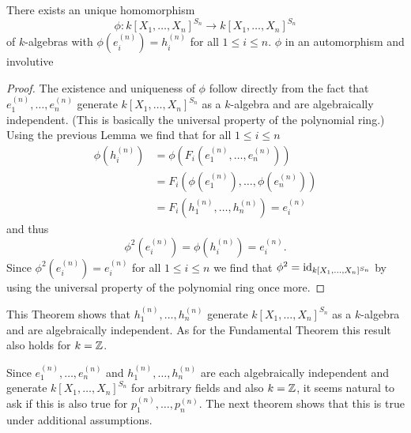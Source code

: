 \begin{theorem}
There exists an unique homomorphism
\[
          \phi
  \colon  k[X_1, \dotsc, X_n]^{S_n}
  \to     k[X_1, \dotsc, X_n]^{S_n}
\]
of $k$-algebras with $\phi\left(e^{(n)}_i\right) = h^{(n)}_i$ for all $1 \leq i \leq n$.
$\phi$ in an automorphism and involutive
\end{theorem}
\begin{proof}
  The existence and uniqueness of $\phi$ follow directly from the fact that $e^{(n)}_1, \dotsc, e^{(n)}_n$ generate $k[X_1, \dotsc, X_n]^{S_n}$ as a $k$-algebra and are algebraically independent.
  (This is basically the universal property of the polynomial ring.)
  Using the previous Lemma we find that for all $1 \leq i \leq n$
  \begin{align*}
        \phi\left(h^{(n)}_i\right)
    &=  \phi\left(F_i\left(e^{(n)}_1, \dotsc, e^{(n)}_n\right)\right) \\
    &=  F_i\left(\phi\left(e^{(n)}_1\right), \dotsc, \phi\left(e^{(n)}_n\right)\right) \\
    &=  F_i\left(h^{(n)}_1, \dotsc, h^{(n)}_n\right)
    =   e^{(n)}_i
  \end{align*}
  and thus
  \[
      \phi^2\left(e^{(n)}_i\right)
    = \phi\left(h^{(n)}_i\right) = e^{(n)}_i.
  \]
  Since $\phi^2\left(e^{(n)}_i\right) = e^{(n)}_i$ for all $1 \leq i \leq n$ we find that $\phi^2 = \operatorname{id}_{k[X_1, \dotsc, X_n]^{S_n}}$ by using the universal property of the polynomial ring once more.
\end{proof}


This Theorem shows that $h^{(n)}_1, \dotsc, h^{(n)}_n$ generate $k[X_1, \dotsc, X_n]^{S_n}$ as a $k$-algebra and are algebraically independent.
As for the Fundamental Theorem this result also holds for $k = \mathbb{Z}$.


Since $e^{(n)}_1, \dotsc, e^{(n)}_n$ and $h^{(n)}_1, \dotsc, h^{(n)}_n$ are each algebraically independent and generate $k[X_1, \dotsc, X_n]^{S_n}$ for arbitrary fields and also $k = \mathbb{Z}$, it seems natural to ask if this is also true for $p^{(n)}_1, \dotsc, p^{(n)}_n$.
The next theorem shows that this is true under additional assumptions.


